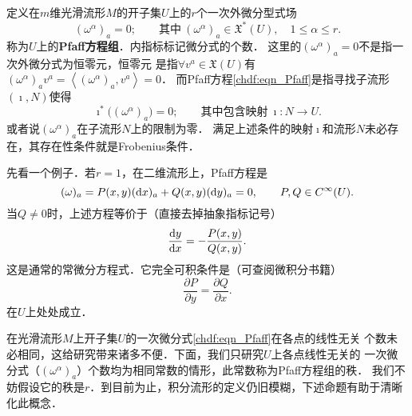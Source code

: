 定义在$m$维光滑流形$M$的开子集$U$上的$r$个一次外微分型式场
\begin{equation}\label{chdf:eqn_Pfaff}
    (\omega^\alpha)_a = 0;\qquad {\text{其中}}\ (\omega^\alpha)_a
    \in\mathfrak{X}^*(U), \quad 1\leqslant \alpha \leqslant r.
\end{equation}
称为$U$上的{\bfseries \heiti Pfaff方程组}．内指标标记微分式的个数．
这里的$(\omega^\alpha)_a = 0$不是指一次外微分式为恒零元，恒零元
是指$\forall v^a\in \mathfrak{X}(U)$有$(\omega^\alpha)_a v^a =\left<(\omega^\alpha)_a, v^a\right>=0$．
而Pfaff方程\eqref{chdf:eqn_Pfaff}是指寻找子流形$(\imath,N)$使得
\begin{equation}\label{chdf:eqn_solution-ed}
    \imath^* \bigl((\omega^\alpha)_a \bigr) = 0; \qquad \text{其中包含映射}\ \imath:N\to U .
\end{equation}
或者说$(\omega^\alpha)_a$在子流形$N$上的限制为零．
满足上述条件的映射$\imath$和流形$N$未必存在，其存在性条件就是Frobenius条件．


先看一个例子．若$r=1$，在二维流形上，Pfaff方程是
\begin{equation}
    (\omega)_a = P(x,y)({\rm d}x)_a +Q(x,y)({\rm d}y)_a =0, \qquad P,Q\in C^\infty(U).
\end{equation}
当$Q\neq 0$时，上述方程等价于（直接去掉抽象指标记号）
\begin{equation}
    \frac{{\rm d}y}{{\rm d}x}=-\frac{P(x,y)}{Q(x,y)}.
\end{equation}
这是通常的常微分方程式．它完全可积条件是（可查阅微积分书籍）
\begin{equation}
    \frac{\partial P}{\partial y}=\frac{\partial Q}{\partial x}.
\end{equation}
在$U$上处处成立．



在光滑流形$M$上开子集$U$的一次微分式\eqref{chdf:eqn_Pfaff}在各点的线性无关
个数未必相同，这给研究带来诸多不便．下面，我们只研究$U$上各点线性无关的
一次微分式（$(\omega^\alpha)_a$）个数均为相同常数的情形，此常数称为Pfaff方程组的{\heiti 秩}．
我们不妨假设它的秩是$r$．到目前为止，积分流形的定义仍旧模糊，下述命题有助于清晰化此概念．

